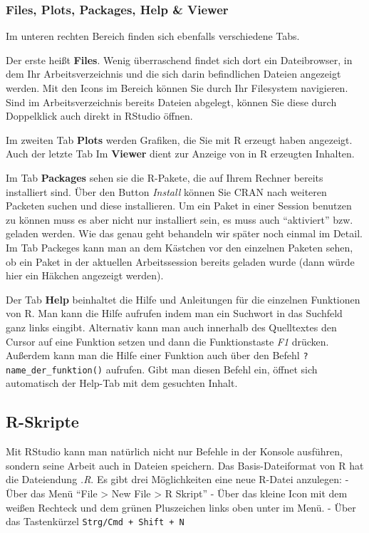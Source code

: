 \documentclass[
]{book}
\begin{document}
\hypertarget{files-plots-packages-help-viewer}{%
\subsubsection{Files, Plots, Packages, Help \& Viewer}\label{files-plots-packages-help-viewer}}

Im unteren rechten Bereich finden sich ebenfalls verschiedene Tabs.

Der erste heißt \textbf{Files}. Wenig überraschend findet sich dort ein Dateibrowser, in dem Ihr Arbeitsverzeichnis und die sich darin befindlichen Dateien angezeigt werden.
Mit den Icons im Bereich können Sie durch Ihr Filesystem navigieren.
Sind im Arbeitsverzeichnis bereits Dateien abgelegt, können Sie diese durch Doppelklick auch direkt in RStudio öffnen.

Im zweiten Tab \textbf{Plots} werden Grafiken, die Sie mit R erzeugt haben angezeigt.
Auch der letzte Tab Im \textbf{Viewer} dient zur Anzeige von in R erzeugten Inhalten.

Im Tab \textbf{Packages} sehen sie die R-Pakete, die auf Ihrem Rechner bereits installiert sind.
Über den Button \emph{Install} können Sie CRAN nach weiteren Packeten suchen und diese installieren.
Um ein Paket in einer Session benutzen zu können muss es aber nicht nur installiert sein, es muss auch ``aktiviert'' bzw. geladen werden. Wie das genau geht behandeln wir später noch einmal im Detail.
Im Tab Packeges kann man an dem Kästchen vor den einzelnen Paketen sehen, ob ein Paket in der aktuellen Arbeitssession bereits geladen wurde (dann würde hier ein Häkchen angezeigt werden).

Der Tab \textbf{Help} beinhaltet die Hilfe und Anleitungen für die einzelnen Funktionen von R.
Man kann die Hilfe aufrufen indem man ein Suchwort in das Suchfeld ganz links eingibt. Alternativ kann man auch innerhalb des Quelltextes den Cursor auf eine Funktion setzen und dann die Funktionstaste \emph{F1} drücken.
Außerdem kann man die Hilfe einer Funktion auch über den Befehl \texttt{?name\_der\_funktion()} aufrufen. Gibt man diesen Befehl ein, öffnet sich automatisch der Help-Tab mit dem gesuchten Inhalt.

\hypertarget{r-skripte}{%
\subsection{R-Skripte}\label{r-skripte}}

Mit RStudio kann man natürlich nicht nur Befehle in der Konsole ausführen, sondern seine Arbeit auch in Dateien speichern. Das Basis-Dateiformat von R hat die Dateiendung \emph{.R}. Es gibt drei Möglichkeiten eine neue R-Datei anzulegen:
- Über das Menü ``File \textgreater{} New File \textgreater{} R Skript''
- Über das kleine Icon mit dem weißen Rechteck und dem grünen Pluszeichen links oben unter im Menü.
- Über das Tastenkürzel \texttt{Strg/Cmd\ +\ Shift\ +\ N}
\end{document}
